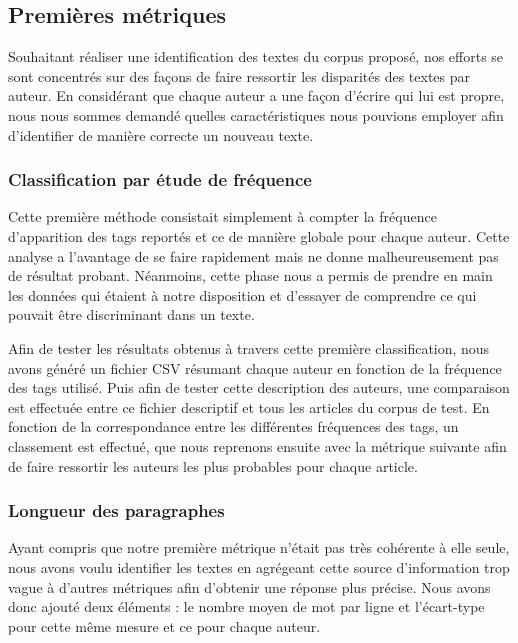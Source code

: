 \documentclass[a4paper,12pt]{report}
\begin{document}
\subsection{Premières métriques}

Souhaitant réaliser une identification des textes du corpus proposé, nos efforts se sont concentrés sur des façons de faire ressortir les disparités des textes par auteur. En considérant que chaque auteur a une façon d'écrire qui lui est propre, nous nous sommes demandé quelles caractéristiques nous pouvions employer afin d'identifier de manière correcte un nouveau texte.

\subsubsection{Classification par étude de fréquence}

Cette première méthode consistait simplement à compter la fréquence d'apparition des tags reportés et ce de manière globale pour chaque auteur. Cette analyse a l'avantage de se faire rapidement mais ne donne malheureusement pas de résultat probant. Néanmoins, cette phase nous a permis de prendre en main les données qui étaient à notre disposition et d'essayer de comprendre ce qui pouvait être discriminant dans un texte.

Afin de tester les résultats obtenus à travers cette première classification, nous avons généré un fichier CSV résumant chaque auteur en fonction de la fréquence des tags utilisé. Puis afin de tester cette description des auteurs, une comparaison est effectuée entre ce fichier descriptif et tous les articles du corpus de test. En fonction de la correspondance entre les différentes fréquences des tags, un classement est effectué, que nous reprenons ensuite avec la métrique suivante afin de faire ressortir les auteurs les plus probables pour chaque article.


\subsubsection{Longueur des paragraphes}

Ayant compris que notre première métrique n'était pas très cohérente à elle seule, nous avons voulu identifier les textes en agrégeant cette source d'information trop vague à d'autres métriques afin d'obtenir une réponse plus précise. Nous avons donc ajouté deux éléments : le nombre moyen de mot par ligne et l'écart-type pour cette même mesure et ce pour chaque auteur.
\end{document}
